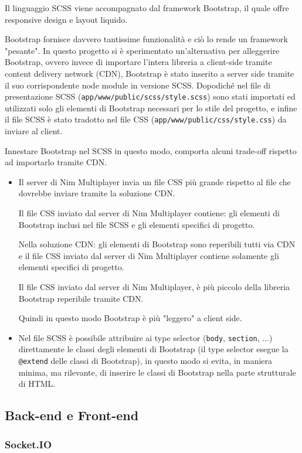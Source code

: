 Il linguaggio SCSS viene accompagnato dal framework Bootstrap, il quale offre responsive design e layout liquido.

Bootstrap fornisce davvero tantissime funzionalità e ciò lo rende un framework "pesante". In questo progetto si è sperimentato un'alternativa per alleggerire Bootstrap, ovvero invece di importare l'intera libreria a client-side tramite content delivery network (CDN), Bootstrap è stato inserito a server side tramite il suo corrispondente node module in versione SCSS. Dopodiché nel file di presentazione SCSS (\texttt{app/www/public/scss/style.scss}) sono stati importati ed utilizzati solo gli elementi di Bootstrap necessari per lo stile del progetto, e infine il file SCSS è stato tradotto nel file CSS (\texttt{app/www/public/css/style.css}) da inviare al client.

Innestare Bootstrap nel SCSS in questo modo, comporta alcuni trade-off rispetto ad importarlo tramite CDN.
\begin{itemize}
\item
	Il server di Nim Multiplayer invia un file CSS più grande rispetto al file che dovrebbe inviare tramite la soluzione CDN.
	
	Il file CSS inviato dal server di Nim Multiplayer contiene: gli elementi di Bootstrap inclusi nel file SCSS e gli elementi specifici di progetto.
	
	Nella soluzione CDN: gli elementi di Bootstrap sono reperibili tutti via CDN e il file CSS inviato dal server di Nim Multiplayer contiene solamente gli elementi specifici di progetto.
	
	Il file CSS inviato dal server di Nim Multiplayer, è più piccolo della libreria Bootstrap reperibile tramite CDN.
	
	Quindi in questo modo Bootstrap è più "leggero" a client side.
\item
	Nel file SCSS è possibile attribuire ai type selector ({\texttt{body}, \texttt{section}, ...}) direttamente le classi degli elementi di Bootstrap (il type selector esegue la \texttt{@extend} delle classi di Bootstrap), in questo modo si evita, in maniera minima, ma rilevante, di inserire le classi di Bootstrap nella parte strutturale di HTML.
\end{itemize}

\subsection{Back-end e Front-end}

\subsubsection{Socket.IO}

